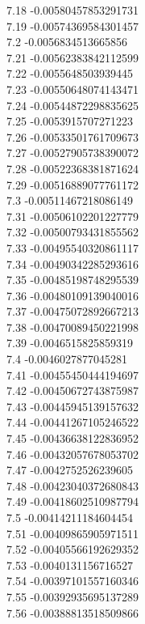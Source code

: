 {7.18	-0.00580457853291731\\
7.19	-0.00574369584301457\\
7.2	-0.0056834513665856\\
7.21	-0.00562383842112599\\
7.22	-0.0055648503939445\\
7.23	-0.00550648074143471\\
7.24	-0.00544872298835625\\
7.25	-0.0053915707271223\\
7.26	-0.00533501761709673\\
7.27	-0.00527905738390072\\
7.28	-0.00522368381871624\\
7.29	-0.00516889077761172\\
7.3	-0.00511467218086149\\
7.31	-0.00506102201227779\\
7.32	-0.00500793431855562\\
7.33	-0.00495540320861117\\
7.34	-0.00490342285293616\\
7.35	-0.00485198748295539\\
7.36	-0.00480109139040016\\
7.37	-0.00475072892667213\\
7.38	-0.00470089450221998\\
7.39	-0.0046515825859319\\
7.4	-0.0046027877045281\\
7.41	-0.00455450444194697\\
7.42	-0.00450672743875987\\
7.43	-0.00445945139157632\\
7.44	-0.00441267105246522\\
7.45	-0.00436638122836952\\
7.46	-0.00432057678053702\\
7.47	-0.0042752526239605\\
7.48	-0.00423040372680843\\
7.49	-0.00418602510987794\\
7.5	-0.00414211184604454\\
7.51	-0.00409865905971511\\
7.52	-0.00405566192629352\\
7.53	-0.0040131156716527\\
7.54	-0.00397101557160346\\
7.55	-0.00392935695137289\\
7.56	-0.00388813518509866\\
}
